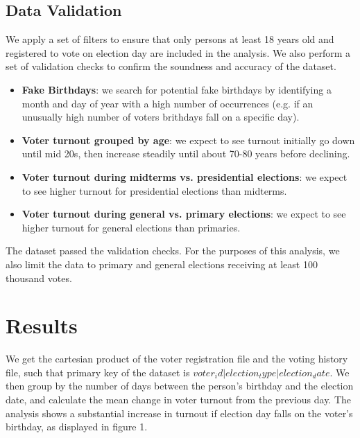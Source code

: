 \documentclass[12pt, letterpaper]{article}
\begin{document}
\subsection{Data Validation}

We apply a set of filters to ensure that only persons at least 18 years old and registered to vote on election day are included in the analysis. We also perform a set of validation checks to confirm the soundness and accuracy of the dataset.

\begin{itemize}

	\item \textbf{Fake Birthdays}: we search for potential fake birthdays by identifying a month and day of year with a high number of occurrences (e.g. if an unusually high number of voters brithdays fall on a specific day).

	\item \textbf{Voter turnout grouped by age}: we expect to see turnout initially go down until mid 20s, then increase steadily until about 70-80 years before declining.

	\item \textbf{Voter turnout during midterms vs. presidential elections}: we expect to see higher turnout for presidential elections than midterms.

	\item \textbf{Voter turnout during general vs. primary elections}: we expect to see higher turnout for general elections than primaries.

\end{itemize}

The dataset passed the validation checks. For the purposes of this analysis, we also limit the data to primary and general elections receiving at least 100 thousand votes. 

\section{Results}
We get the cartesian product of the voter registration file and the voting history file, such that primary key of the dataset is $voter_id | election_type | election_date$. We then group by the number of days between the person’s birthday and the election date, and calculate the mean change in voter turnout from the previous day. The analysis shows a substantial increase in turnout if election day falls on the voter’s birthday, as displayed in figure 1.
\end{document}
